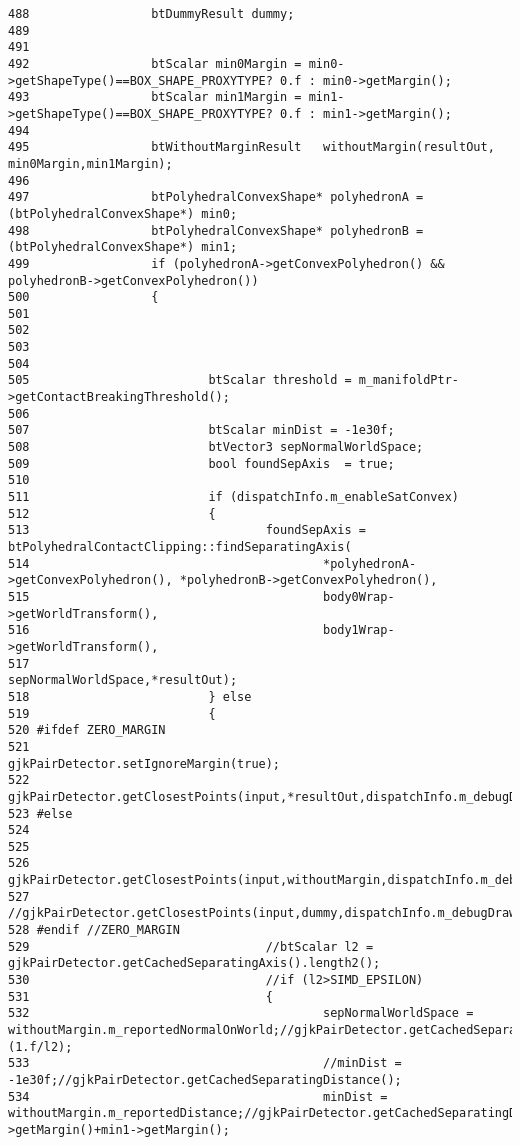 \begin{Code}
\begin{verbatim}
488                 btDummyResult dummy;
489 
491 
492                 btScalar min0Margin = min0->getShapeType()==BOX_SHAPE_PROXYTYPE? 0.f : min0->getMargin();
493                 btScalar min1Margin = min1->getShapeType()==BOX_SHAPE_PROXYTYPE? 0.f : min1->getMargin();
494 
495                 btWithoutMarginResult   withoutMargin(resultOut, min0Margin,min1Margin);
496 
497                 btPolyhedralConvexShape* polyhedronA = (btPolyhedralConvexShape*) min0;
498                 btPolyhedralConvexShape* polyhedronB = (btPolyhedralConvexShape*) min1;
499                 if (polyhedronA->getConvexPolyhedron() && polyhedronB->getConvexPolyhedron())
500                 {
501 
502 
503                         
504 
505                         btScalar threshold = m_manifoldPtr->getContactBreakingThreshold();
506 
507                         btScalar minDist = -1e30f;
508                         btVector3 sepNormalWorldSpace;
509                         bool foundSepAxis  = true;
510 
511                         if (dispatchInfo.m_enableSatConvex)
512                         {
513                                 foundSepAxis = btPolyhedralContactClipping::findSeparatingAxis(
514                                         *polyhedronA->getConvexPolyhedron(), *polyhedronB->getConvexPolyhedron(),
515                                         body0Wrap->getWorldTransform(), 
516                                         body1Wrap->getWorldTransform(),
517                                         sepNormalWorldSpace,*resultOut);
518                         } else
519                         {
520 #ifdef ZERO_MARGIN
521                                 gjkPairDetector.setIgnoreMargin(true);
522                                 gjkPairDetector.getClosestPoints(input,*resultOut,dispatchInfo.m_debugDraw);
523 #else
524 
525 
526                                 gjkPairDetector.getClosestPoints(input,withoutMargin,dispatchInfo.m_debugDraw);
527                                 //gjkPairDetector.getClosestPoints(input,dummy,dispatchInfo.m_debugDraw);
528 #endif //ZERO_MARGIN
529                                 //btScalar l2 = gjkPairDetector.getCachedSeparatingAxis().length2();
530                                 //if (l2>SIMD_EPSILON)
531                                 {
532                                         sepNormalWorldSpace = withoutMargin.m_reportedNormalOnWorld;//gjkPairDetector.getCachedSeparatingAxis()*(1.f/l2);
533                                         //minDist = -1e30f;//gjkPairDetector.getCachedSeparatingDistance();
534                                         minDist = withoutMargin.m_reportedDistance;//gjkPairDetector.getCachedSeparatingDistance()+min0->getMargin()+min1->getMargin();

\end{verbatim}
\end{Code}
